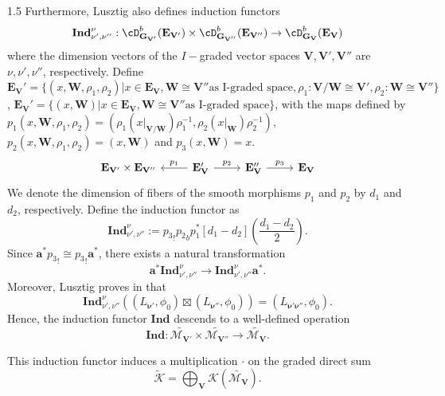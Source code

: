 \documentclass[10pt]{amsart}
\def\bfV{{\mathbf V}}
\def\bfV{\mathbf{V}}
\def\bfW{\mathbf{W}}
\def\bfE{\mathbf{E}}
\def\bfG{\mathbf{G}}
\def\Ind{\mathbf{Ind}}
\newcommand\mk{{\mathcal{K}}}
\newcommand\mm{{\mathcal{M}}}
\begin{document}
\begin{spacing}{1.5}
Furthermore, Lusztig also defines induction functors
 $$\Ind_{\nu',\nu''}^{\nu}:\cD_{\bfG_{\bfV'}}^b(\bfE_{\bfV'})\times\cD_{\bfG_{\bfV''}}^b(\bfE_{\bfV''})\rightarrow \cD_{\bfG_{\bfV}}^b(\bfE_{\bfV})$$ where the dimension vectors of the $I-$graded vector spaces $\bfV, \bfV', \bfV''$ are $\nu, \nu', \nu''$, respectively. Define $\bfE_{\bfV}'=\{(x,\bfW,\rho_1,\rho_2)|x\in \bfE_{\bfV},\bfW\cong \bfV''\text{as I-graded space}, \rho_1:\bfV/\bfW\cong \bfV', \rho_2: \bfW\cong \bfV''\}$, $\bfE_{\bfV}'=\{(x,\bfW)|x\in \bfE_{\bfV},\bfW\cong \bfV''\text{as I-graded space}\}$, with the maps defined by $p_1(x,\bfW,\rho_1,\rho_2)=(\rho_1(x|_{\bfV/\bfW})\rho_1^{-1},\rho_2(x|_{\bfW})\rho_2^{-1})$, $p_2(x,\bfW,\rho_1,\rho_2)=(x,\bfW)$ and $p_3(x,\bfW)=x$.
$$\begin{tikzcd}
\bfE_{\bfV'}\times \bfE_{\bfV''} & \bfE_{\bfV}' \arrow[l, "p_1"'] \arrow[r, "p_2"] & \bfE_{\bfV}'' \arrow[r, "p_3"] & \bfE_{\bfV}
\end{tikzcd}$$
We denote the dimension of fibers of the smooth morphisms $p_1$ and $p_2$ by $d_1$ and $d_2$, respectively. Define the induction functor as
\[
\Ind_{\nu',\nu''}^{\nu} := {p_3}_! {p_2}_b p_1^* [d_1 - d_2] \left( \frac{d_1 - d_2}{2} \right).
\]
Since $\mathbf{a}^* {p_3}_! \cong {p_3}_! \mathbf{a}^*$, there exists a natural transformation
\[
\mathbf{a}^* \Ind_{\nu',\nu''}^{\nu} \rightarrow \Ind_{\nu',\nu''}^{\nu} \mathbf{a}^*.
\]
Moreover, Lusztig proves in \cite[Lemma 12.3.2]{lusztig2010introduction} that
\[
\Ind_{\nu',\nu''}^{\nu} \left( (L_{\boldsymbol{\nu'}}, \phi_0) \boxtimes (L_{\boldsymbol{\nu''}}, \phi_0) \right) = (L_{\boldsymbol{\nu'\nu''}}, \phi_0).
\]
Hence, the induction functor $\Ind$ descends to a well-defined operation
\[
\Ind : \widetilde{\mm_{\bfV'}} \times \widetilde{\mm_{\bfV''}} \rightarrow \widetilde{\mm_{\bfV}}.
\]

This induction functor induces a multiplication $\cdot$ on the graded direct sum
\[
\tilde{\mk}=\bigoplus_{\bfV} \mk(\widetilde{\mm_{\bfV}}).
\]


\end{spacing}
\end{document}
